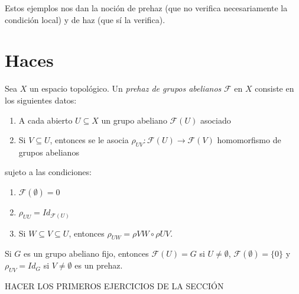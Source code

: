 \documentclass[GA.tex]{subfiles}
\begin{document}
Estos ejemplos nos dan la noción de prehaz (que no verifica necesariamente la condición local) y de haz (que sí la verifica).

\section{Haces}

\begin{defi}
Sea $X$ un espacio topológico. Un \emph{prehaz de grupos abelianos} $\mathcal{F}$ en $X$ consiste en los siguientes datos:
\begin{enumerate}
\item A cada abierto $U\subseteq X$ un grupo abeliano $\mathcal{F}(U)$ asociado
\item Si $V\subseteq U$, entonces se le asocia $\rho_{UV}:\mathcal{F}(U)\to\mathcal{F}(V)$ homomorfismo de grupos abelianos
\end{enumerate}
sujeto a las condiciones:
\begin{enumerate}
\item $\mathcal{F}(\emptyset)=0$
\item $\rho_{UU}=Id_{\mathcal{F}(U)}$
\item Si $W\subseteq V\subseteq U$, entonces $\rho_{UW}=\rho{VW}\circ \rho{UV}$.
\end{enumerate}

\end{defi}

\begin{ej}
Si $G$  es un grupo abeliano fijo, entonces $\mathcal{F}(U)=G$ si $U\neq\emptyset$, $\mathcal{F}(\emptyset)=\{0\}$ y $\rho_{UV}=Id_G$ si $V\neq \emptyset$ es un prehaz.
\end{ej}


HACER LOS PRIMEROS EJERCICIOS DE LA SECCIÓN
\end{document}
